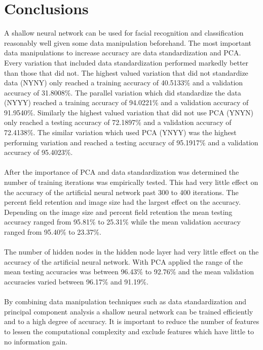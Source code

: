 \documentclass[12pt]{article}
\begin{document}
\section{Conclusions}
A shallow neural network can be used for facial recognition and classification reasonably well given some data manipulation beforehand. The most important data manipulations to increase accuracy are data standardization and PCA. Every variation that included data standardization performed markedly better than those that did not. The highest valued variation that did not standardize data (NYNY) only reached a training accuracy of 40.5133\% and a validation accuracy of 31.8008\%. The parallel variation which did standardize the data (NYYY) reached a training accuracy of 94.0221\% and a validation accuracy of 91.9540\%. Similarly the highest valued variation that did not use PCA (YNYN) only reached a testing accuracy of 72.1897\% and a validation accuracy of 72.4138\%. The similar variation which used PCA (YNYY) was the highest performing variation and reached a testing accuracy of 95.1917\% and a validation accuracy of 95.4023\%.\\
\\
After the importance of PCA and data standardization was determined the number of training iterations was empirically tested. This had very little effect on the accuracy of the artificial neural network past 300 to 400 iterations. The percent field retention and image size had the largest effect on the accuracy. Depending on the image size and percent field retention the mean testing accuracy ranged from 95.81\% to 25.31\% while the mean validation accuracy ranged from 95.40\% to 23.37\%.\\
\\
The number of hidden nodes in the hidden node layer had very little effect on the accuracy of the artificial neural network. With PCA applied the range of the mean testing accuracies was between 96.43\% to 92.76\% and the mean validation accuracies varied between 96.17\% and 91.19\%.\\
\\
By combining data manipulation techniques such as data standardization and principal component analysis a shallow neural network can be trained efficiently and to a high degree of accuracy. It is important to reduce the number of features to lessen the computational complexity and exclude features which have little to no information gain.\\
\end{document}

